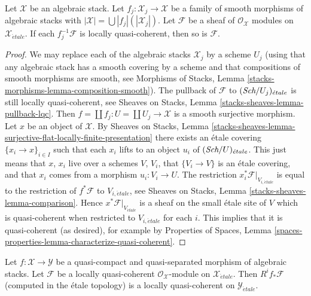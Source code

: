 \begin{lemma}
\label{lemma-check-lqc-on-etale-covering}
Let $\mathcal{X}$ be an algebraic stack. Let
$f_j : \mathcal{X}_j \to \mathcal{X}$ be a family of smooth
morphisms of algebraic stacks with
$|\mathcal{X}| =\bigcup |f_j|(|\mathcal{X}_j|)$.
Let $\mathcal{F}$ be a sheaf of $\mathcal{O}_\mathcal{X}$ modules
on $\mathcal{X}_{\acute{e}tale}$. If each $f_j^{-1}\mathcal{F}$
is locally quasi-coherent, then so is $\mathcal{F}$.
\end{lemma}

\begin{proof}
We may replace each of the algebraic stacks $\mathcal{X}_j$ by
a scheme $U_j$ (using that any algebraic stack has a smooth covering by
a scheme and that compositions of smooth morphisms are smooth, see
Morphisms of Stacks, Lemma \ref{stacks-morphisms-lemma-composition-smooth}).
The pullback of $\mathcal{F}$ to $(\textit{Sch}/U_j)_{\acute{e}tale}$ is still
locally quasi-coherent, see
Sheaves on Stacks, Lemma \ref{stacks-sheaves-lemma-pullback-lqc}.
Then $f = \coprod f_j : U = \coprod U_j \to \mathcal{X}$ is a smooth surjective
morphism. Let $x$ be an object of $\mathcal{X}$. By
Sheaves on Stacks, Lemma
\ref{stacks-sheaves-lemma-surjective-flat-locally-finite-presentation}
there exists an \'etale covering $\{x_i \to x\}_{i \in I}$
such that each $x_i$ lifts to an object $u_i$ of $(\textit{Sch}/U)_{\acute{e}tale}$.
This just means that $x$, $x_i$ live over a schemes $V$, $V_i$, that
$\{V_i \to V\}$ is an \'etale covering, and that $x_i$ comes from
a morphism $u_i : V_i \to U$. The restriction
$x_i^*\mathcal{F}|_{V_{i, \acute{e}tale}}$ is equal to the restriction
of $f^*\mathcal{F}$ to $V_{i, \acute{e}tale}$, see
Sheaves on Stacks, Lemma \ref{stacks-sheaves-lemma-comparison}.
Hence $x^*\mathcal{F}|_{V_{\acute{e}tale}}$
is a sheaf on the small \'etale site of $V$ which is quasi-coherent
when restricted to $V_{i, \acute{e}tale}$ for each $i$.
This implies that it is quasi-coherent (as desired), for example by
Properties of Spaces, Lemma
\ref{spaces-properties-lemma-characterize-quasi-coherent}.
\end{proof}

\begin{lemma}
\label{lemma-pushforward-locally-quasi-coherent}
Let $f : \mathcal{X} \to \mathcal{Y}$ be a quasi-compact and
quasi-separated morphism of algebraic stacks. Let 
$\mathcal{F}$ be a locally quasi-coherent
$\mathcal{O}_\mathcal{X}$-module on $\mathcal{X}_{\acute{e}tale}$.
Then $R^if_*\mathcal{F}$ (computed in the \'etale topology) is
a locally quasi-coherent on $\mathcal{Y}_{\acute{e}tale}$.
\end{lemma}

